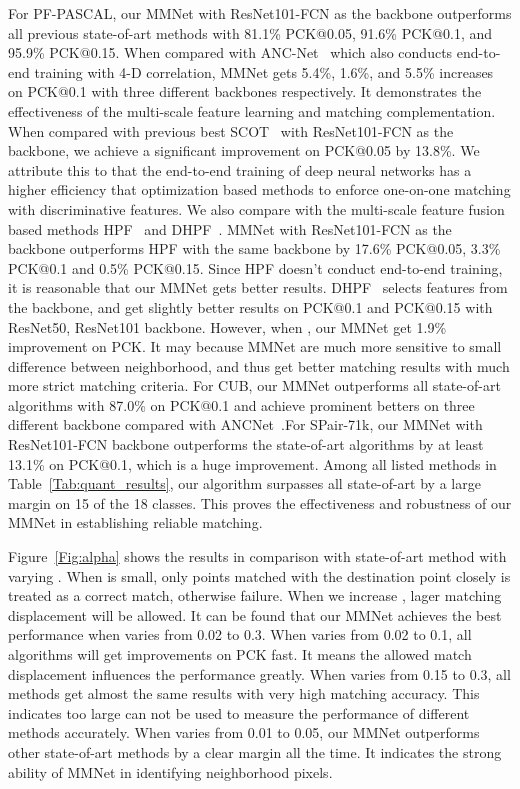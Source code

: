 For PF-PASCAL\cite{ham2017proposal}, our MMNet with ResNet101-FCN as the backbone outperforms all previous state-of-art methods with 81.1\% PCK@0.05, 91.6\% PCK@0.1, and 95.9\% PCK@0.15. When compared with ANC-Net~\cite{li2020correspondence} which also conducts end-to-end training with 4-D correlation, MMNet gets 5.4\%, 1.6\%, and 5.5\% increases on PCK@0.1 with three different backbones respectively. It demonstrates the effectiveness of the multi-scale feature learning and matching complementation. When compared with previous best SCOT~\cite{liu2020semantic} with ResNet101-FCN as the backbone, we achieve a significant improvement on PCK@0.05 by 13.8\%. We attribute this to that the end-to-end training of deep neural networks has a higher efficiency that optimization based methods to enforce one-on-one matching with discriminative features. We also compare with the multi-scale feature fusion based methods  HPF~\cite{min2019hyperpixel} and DHPF~\cite{min2020learning}. MMNet with ResNet101-FCN as the backbone outperforms HPF with the same backbone by 17.6\% PCK@0.05, 3.3\% PCK@0.1 and 0.5\% PCK@0.15. Since HPF doesn't conduct end-to-end training, it is reasonable that our MMNet gets better results. DHPF~\cite{min2020learning} selects features from the backbone, and get slightly better results on PCK@0.1 and PCK@0.15 with ResNet50, ResNet101 backbone. However, when , our MMNet get 1.9\% improvement on PCK. It may because MMNet are much more sensitive to small difference between neighborhood, and thus get better matching results with much more strict matching criteria. For CUB\cite{cub}, our MMNet outperforms all state-of-art algorithms with 87.0\% on PCK@0.1 and achieve prominent betters on three different backbone compared with ANCNet~\cite{li2020correspondence}.For SPair-71k\cite{spair}, our MMNet with ResNet101-FCN backbone outperforms the state-of-art algorithms by at least 13.1\% on PCK@0.1, which is a huge improvement. Among all listed methods in Table~\ref{Tab:quant_results}, our algorithm surpasses all state-of-art by a large margin on 15 of the 18 classes. This proves the effectiveness and robustness of our MMNet in establishing reliable matching. 

Figure~\ref{Fig:alpha} shows the results in comparison with state-of-art method with varying . When  is small, only points matched with the destination point closely is treated as a correct match, otherwise failure. When we increase , lager matching displacement will be allowed. It can be found that our MMNet achieves the best performance when  varies from 0.02 to 0.3. When  varies from 0.02 to 0.1, all algorithms will get improvements on PCK fast. It means the allowed match displacement influences the performance greatly. When  varies from 0.15 to 0.3, all methods get almost the same results with very high matching accuracy. This indicates too large  can not be used to measure the performance of different methods accurately. When  varies from 0.01 to 0.05, our MMNet outperforms other state-of-art methods by a clear margin all the time. It indicates the strong ability of MMNet in identifying neighborhood pixels. 

